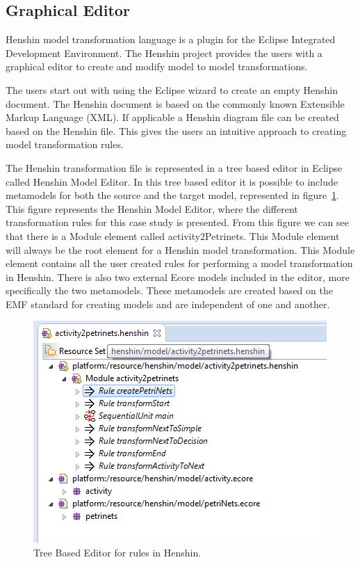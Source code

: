 \subsection{Graphical Editor}
Henshin model transformation language is a plugin for the Eclipse
Integrated Development Environment\cite{Eclipse}. The Henshin project provides
the users with a graphical editor to create and modify model to model
transformations. 

The users start out with using the Eclipse wizard to create an empty Henshin
document. The Henshin document is based on the commonly known Extensible Markup
Language (XML)\cite{XML}. If applicable a Henshin diagram file can be created
based on the Henshin file. This gives the users an intuitive approach to
creating model transformation rules.

The Henshin transformation file is represented in a tree based editor in
Eclipse called Henshin Model Editor. In this tree based editor it is possible
to include metamodels for both the source and the target model, represented in
figure~\ref{fig:Henshin_TreeEditor}. This figure represents the Henshin
Model Editor, where the different transformation rules for this case study is
presented. From this figure we can see that there is a Module element called
activity2Petrinets. This Module element will always be the root element for a
Henshin model transformation. This Module element contains all the user created
rules for performing a model transformation in Henshin. There is also two
external Ecore models included in the editor, more specifically the two
metamodels. These metamodels are created based on the EMF standard for creating
models and are independent of one and another.

\begin{figure}[H]
	\centering
	\includegraphics[scale=0.7]{figures/Henshin_TreeEdtiro.png}
	\caption[The Henshin Model Editor]
	{Tree Based Editor for rules in Henshin.}
	\label{fig:Henshin_TreeEditor}
\end{figure}


